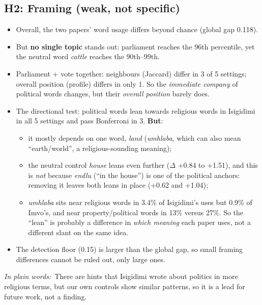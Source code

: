 \documentclass[11pt]{article}
\newcommand{\key}[1]{\textbf{#1}}
\newenvironment{plain}{\par\smallskip\noindent\begin{minipage}{\linewidth}\color{black!75}\small\textit{In plain words:}~}{\end{minipage}\par\smallskip}
\begin{document}
\subsection*{H2: Framing (weak, not specific)}
\begin{itemize}
\item Overall, the two papers' word usage differs beyond chance (global gap 0.118).
\item But \key{no single topic} stands out: parliament reaches the 96th percentile, yet the neutral word \emph{cattle} reaches the 90th--99th.
\item Parliament + vote together: neighbours (Jaccard) differ in 3 of 5 settings; overall position (profile) differs in only 1. So the \emph{immediate company} of political words changes, but their \emph{overall position} barely does.
\item The directional test: political words lean towards religious words in Isigidimi in all 5 settings and pass Bonferroni in 3. \key{But}:
 \begin{itemize}
 \item it mostly depends on one word, \emph{land} (\emph{umhlaba}, which can also mean ``earth/world'', a religious-sounding meaning);
 \item the neutral control \emph{house} leans even further ($\Delta$ +0.84 to +1.51), and this is \emph{not} because \emph{endlu} (``in the house'') is one of the political anchors: removing it leaves both leans in place (+0.62 and +1.04);
 \item \emph{umhlaba} sits near religious words in 3.4\% of Isigidimi's uses but 0.9\% of Imvo's, and near property/political words in 13\% versus 27\%. So the ``lean'' is probably a difference in \emph{which meaning} each paper uses, not a different slant on the same idea.
 \end{itemize}
\item The detection floor (0.15) is larger than the global gap, so small framing differences cannot be ruled out, only large ones.
\end{itemize}
\begin{plain}There are hints that Isigidimi wrote about politics in more religious terms, but our own controls show similar patterns, so it is a lead for future work, not a finding.\end{plain}
\end{document}
